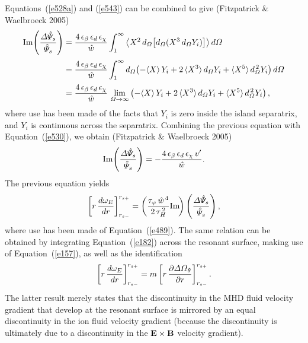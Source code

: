 \documentclass[notitlepage,12pt]{article}
\begin{document}
Equations~(\ref{e528a}) and (\ref{e543}) can be combined to give (Fitzpatrick \& Waelbroeck 2005)
\begin{align}
{\rm Im}\!\left(\frac{{\mit\Delta}\hat{\mit\Psi}_s}{\hat{\mit\Psi}_s}\right) &=\frac{4\,\epsilon_\beta\,\epsilon_d\,\epsilon_\chi}{\hat{w}}\int_1^\infty
\left\langle X^{2}\,d_{\mit\Omega}\!\left[d_{\mit\Omega}(X^3\,d_{\mit\Omega}Y_i)\right]\right\rangle d{\mit\Omega}\nonumber\\[0.5ex]
&=\frac{4\,\epsilon_\beta\,\epsilon_d\,\epsilon_\chi}{\hat{w}}\int_1^\infty d_{\mit\Omega}\!\left(-\langle X\rangle\,Y_i
+2\,\langle X^3\rangle\,d_{\mit\Omega} Y_i + \langle X^5\rangle\,d_{\mit\Omega}^{\,2} Y_i\right)d{\mit\Omega}\nonumber\\[0.5ex]
&= \frac{4\,\epsilon_\beta\,\epsilon_d\,\epsilon_\chi}{\hat{w}}\,\lim_{\mit\Omega\rightarrow\infty}\left(-\langle X\rangle\,Y_i
+2\,\langle X^3\rangle\,d_{\mit\Omega} Y_i + \langle X^5\rangle\,d_{\mit\Omega}^{\,2} Y_i\right),
\end{align}
where use has been made of the facts that $Y_i$ is zero inside the island separatrix, and $Y_i$ is continuous across the separatrix.
Combining the previous equation with Equation~(\ref{e530}), we obtain (Fitzpatrick \& Waelbroeck 2005)
\begin{equation}\label{e545}
{\rm Im}\!\left(\frac{{\mit\Delta}\hat{\mit\Psi}_s}{\hat{\mit\Psi}_s}\right)  =- \frac{4\,\epsilon_\beta\,\epsilon_d\,\epsilon_\chi\,v'}{\hat{w}}.
\end{equation}
The previous equation yields
\begin{equation}
\left[r\,\frac{d\omega_E}{dr}\right]_{r_{s-}}^{r_{s+}} = \left(\frac{\tau_\varphi\,\hat{w}^{\,4}}{2\,\tau_H^{\,2}}{\rm Im}\!\right)\left(\frac{{\mit\Delta}\hat{\mit\Psi}_s}{\hat{\mit\Psi}_s}\right),
\end{equation}
where use has been made of Equation~(\ref{e489}). The same relation can be obtained by integrating Equation~(\ref{e182}) across the resonant surface, making use of Equation~(\ref{e157}), as well as the
identification
\begin{equation}
\left[r\,\frac{d\omega_E}{dr}\right]_{r_{s-}}^{r_{s+}} = m\left[r\,\frac{\partial{\mit\Delta\Omega}_\theta}{\partial r}\right]_{r_{s-}}^{r_{s+}}.
\end{equation}
The latter result merely states that the  discontinuity in the MHD fluid velocity gradient that develop at the resonant
surface is mirrored by an equal discontinuity in the ion fluid velocity gradient (because the discontinuity is ultimately due to 
a discontinuity in the ${\bf E}\times {\bf B}$ velocity gradient). 
\end{document}
